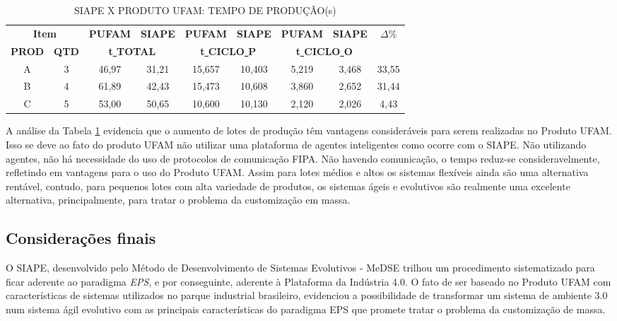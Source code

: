 \begin{table}
 	\small
 	\centering
 	\caption{SIAPE X PRODUTO UFAM: TEMPO DE PRODUÇÃO(s)}
 	\begin{tabular}{c c | c c | c c | c c | c}
		\multicolumn{2}{c|}{\textbf{Item}} & 
		\textbf{PUFAM} & \textbf{SIAPE} & 
		\textbf{PUFAM} & \textbf{SIAPE} & 
		\textbf{PUFAM} & \textbf{SIAPE} &
		\multirow{2}{*}{$\Delta\%$} \\
		
		\textbf{PROD} & \textbf{QTD} & 
		\multicolumn{2}{c|}{\textbf{t\underline{ }TOTAL}} &
		\multicolumn{2}{c|}{\textbf{t\underline{ }CICLO\underline{ }P}} &
		\multicolumn{2}{c|}{\textbf{t\underline{ }CICLO\underline{ }O}} &
		~ \\ \hline \hline
		
	 	A &  3  & 46,97 & 31,21  & 15,657 & 10,403 &  5,219  &  3,468 & 33,55 \\
	 	\hline
	 	
	 	B &  4  & 61,89 & 42,43  & 15,473 & 10,608 &  3,860  &  2,652 & 31,44 \\
	 	\hline
	 	
	 	C &  5  & 53,00 & 50,65  & 10,600 & 10,130 &  2,120  &  2,026 &  4,43 \\
		
		
	\end{tabular}
	\label{T19}\par
\end{table}

A análise da Tabela \ref{T19} evidencia que o aumento de lotes  de produção têm vantagens consideráveis para serem realizadas no Produto UFAM. Isso se deve ao fato do produto UFAM não utilizar uma plataforma de agentes inteligentes como ocorre com o SIAPE. Não utilizando agentes, não há necessidade do uso de protocolos de comunicação FIPA. Não havendo comunicação, o tempo reduz-se consideravelmente, refletindo em vantagens para o uso do Produto UFAM. Assim para lotes médios e altos os sistemas flexíveis ainda são uma alternativa rentável, contudo, para pequenos lotes com alta variedade de produtos, os sistemas ágeis e evolutivos são realmente uma excelente alternativa, principalmente, para tratar o problema da customização em massa.


\subsection{Considerações finais}

O SIAPE, desenvolvido pelo Método de Desenvolvimento de Sistemas Evolutivos - MeDSE trilhou um procedimento sistematizado para ficar aderente ao paradigma \textit{EPS}, e por conseguinte, aderente à Plataforma da Indústria 4.0. O fato de ser baseado no Produto UFAM com características de sistemas utilizados no parque industrial brasileiro, evidenciou a possibilidade de transformar um sistema de ambiente 3.0 num sistema ágil evolutivo com as principais características do paradigma EPS que promete tratar o problema da customização de massa.

